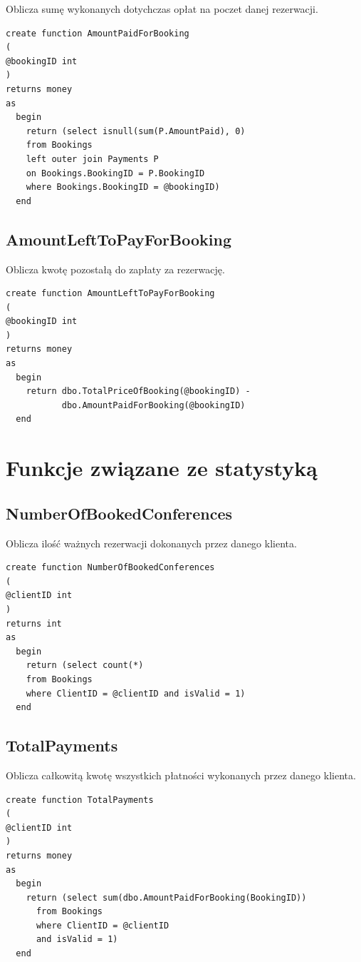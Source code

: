 \documentclass[12pt, a4paper]{mwrep}
\begin{document}
\noindent Oblicza sumę wykonanych dotychczas opłat na poczet danej rezerwacji.
\begin{lstlisting}
create function AmountPaidForBooking
(
@bookingID int
)
returns money
as
  begin
    return (select isnull(sum(P.AmountPaid), 0)
    from Bookings
    left outer join Payments P 
    on Bookings.BookingID = P.BookingID
    where Bookings.BookingID = @bookingID)
  end
\end{lstlisting}

\subsection{AmountLeftToPayForBooking}

\noindent Oblicza kwotę pozostałą do zapłaty za rezerwację.
\begin{lstlisting}
create function AmountLeftToPayForBooking
(
@bookingID int
)
returns money
as
  begin
    return dbo.TotalPriceOfBooking(@bookingID) - 
           dbo.AmountPaidForBooking(@bookingID)
  end
\end{lstlisting}

\section{Funkcje związane ze statystyką}

\subsection{NumberOfBookedConferences}

\noindent Oblicza ilość ważnych rezerwacji dokonanych przez danego klienta.
\begin{lstlisting}
create function NumberOfBookedConferences
(
@clientID int
)
returns int
as
  begin
    return (select count(*)
    from Bookings
    where ClientID = @clientID and isValid = 1)
  end
\end{lstlisting}

\subsection{TotalPayments}

\noindent Oblicza całkowitą kwotę wszystkich płatności wykonanych przez danego klienta.
\begin{lstlisting}
create function TotalPayments
(
@clientID int
)
returns money
as
  begin
    return (select sum(dbo.AmountPaidForBooking(BookingID))
      from Bookings
      where ClientID = @clientID
      and isValid = 1)
  end
\end{lstlisting}
\end{document}
